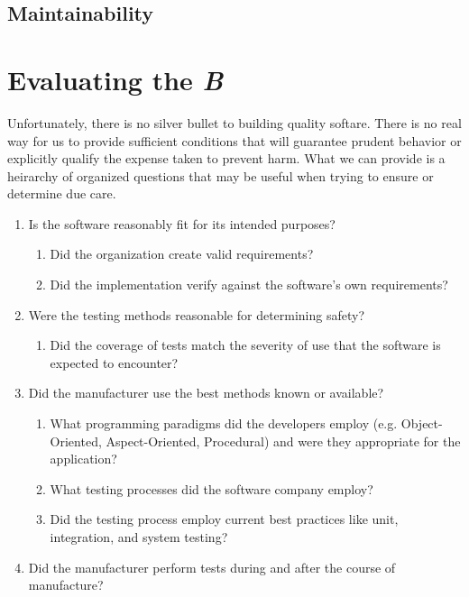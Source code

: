 \subsection{Maintainability}

\section{Evaluating the \textit{B}}

Unfortunately, there is no silver bullet \cite{Brooks87} to building quality
softare. There is no real way for us to provide sufficient conditions that will
guarantee prudent behavior or explicitly qualify the expense taken to prevent
harm. What we can provide is a heirarchy of organized questions that may be 
useful when trying to ensure or determine due care.

\singlespace
\begin{enumerate}
  \item Is the software reasonably fit for its intended purposes?
  \begin{enumerate}
    \item Did the organization create valid requirements?
    \item Did the implementation verify against the software's own requirements?
  \end{enumerate}
  \item Were the testing methods reasonable for determining safety?
    \begin{enumerate}
    \item Did the coverage of tests match the severity of use that the
    software is expected to encounter?
    \end{enumerate}
  \item Did the manufacturer use the best methods known or available?
    \begin{enumerate}
      \item What programming paradigms did the developers employ (e.g.
      Object-Oriented, Aspect-Oriented, Procedural) and were they appropriate
      for the application?
      \item What testing processes did the software company employ?
      \item Did the testing process employ current best practices like unit,
      integration, and system testing?
    \end{enumerate}
  \item Did the manufacturer perform tests during and after the course of
  manufacture? 
\end{enumerate}
  \doublespace
